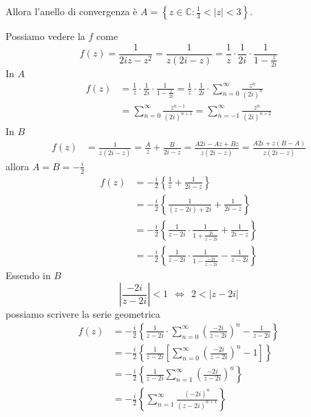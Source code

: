 Allora l'anello di convergenza è $A=\left\{z\in \mathbb{C} :\frac{1}{3} < \left| z\right| < 3\right\}$.
\Soluzione

Possiamo vedere la $f$ come
\begin{equation*}
f\left( z\right) =\frac{1}{2iz-z^{2}} =\frac{1}{z\left( 2i-z\right)} =\frac{1}{z} \cdotp \frac{1}{2i} \cdotp \frac{1}{1-\frac{z}{2i}}
\end{equation*}
In $A$
\begin{align*}
f\left( z\right) & =\frac{1}{z} \cdotp \frac{1}{2i} \cdotp \frac{1}{1-\frac{z}{2i}} =\frac{1}{z} \cdotp \frac{1}{2i} \cdotp \sum\limits ^{\infty }_{n=0}\frac{z^{n}}{\left( 2i\right)^{n}}\\
 & =\sum\limits ^{\infty }_{n=0}\frac{z^{n-1}}{\left( 2i\right)^{n+1}} =\sum\limits ^{\infty }_{n=-1}\frac{z^{n}}{\left( 2i\right)^{n+2}}
\end{align*}
In $B$
\begin{align*}
f\left( z\right) & =\frac{1}{z\left( 2i-z\right)} =\frac{A}{z} +\frac{B}{2i-z} =\frac{A2i-Az+Bz}{z\left( 2i-z\right)} =\frac{A2i+z\left( B-A\right)}{z\left( 2i-z\right)}
\end{align*}
allora $A=B=-\frac{i}{2}$
\begin{align*}
f\left( z\right) & =-\frac{i}{2}\left\{\frac{1}{z} +\frac{1}{2i-z}\right\}\\
 & =-\frac{i}{2}\left\{\frac{1}{\left( z-2i\right) +2i} +\frac{1}{2i-z}\right\}\\
 & =-\frac{i}{2}\left\{\frac{1}{z-2i} \cdotp \frac{1}{1+\frac{2i}{z-2i}} +\frac{1}{2i-z}\right\}\\
 & =-\frac{i}{2}\left\{\frac{1}{z-2i} \cdotp \frac{1}{1-\frac{-2i}{z-2i}} -\frac{1}{z-2i}\right\}
\end{align*}
Essendo in $B$
\begin{equation*}
\left| \frac{-2i}{z-2i}\right| < 1\ \ \iff \ \ 2< \left| z-2i\right| 
\end{equation*}
possiamo scrivere la serie geometrica
\begin{align*}
f\left( z\right) & =-\frac{i}{2}\left\{\frac{1}{z-2i} \cdotp \sum\limits ^{\infty }_{n=0}\left(\frac{-2i}{z-2i}\right)^{n} -\frac{1}{z-2i}\right\}\\
 & =-\frac{i}{2}\left\{\frac{1}{z-2i}\left[\sum\limits ^{\infty }_{n=0}\left(\frac{-2i}{z-2i}\right)^{n} -1\right]\right\}\\
 & =-\frac{i}{2}\left\{\frac{1}{z-2i}\sum\limits ^{\infty }_{n=1}\left(\frac{-2i}{z-2i}\right)^{n}\right\}\\
 & =-\frac{i}{2}\left\{\sum\limits ^{\infty }_{n=1}\frac{\left( -2i\right)^{n}}{\left( z-2i\right)^{n+1}}\right\}
\end{align*}
